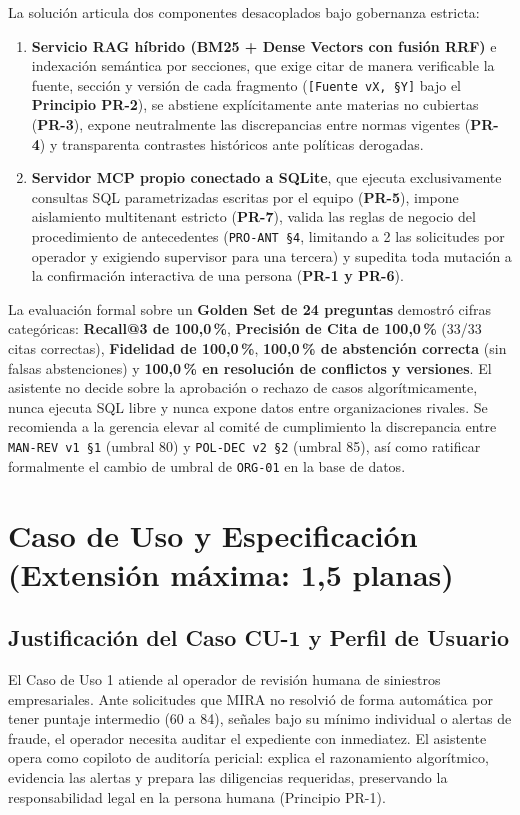 \documentclass[11pt,letterpaper]{article}
\begin{document}
La solución articula dos componentes desacoplados bajo gobernanza estricta:
\begin{enumerate}
    \item \textbf{Servicio RAG híbrido (BM25 + Dense Vectors con fusión RRF)} e indexación semántica por secciones, que exige citar de manera verificable la fuente, sección y versión de cada fragmento (\texttt{[Fuente vX, §Y]} bajo el \textbf{Principio PR-2}), se abstiene explícitamente ante materias no cubiertas (\textbf{PR-3}), expone neutralmente las discrepancias entre normas vigentes (\textbf{PR-4}) y transparenta contrastes históricos ante políticas derogadas.
    \item \textbf{Servidor MCP propio conectado a SQLite}, que ejecuta exclusivamente consultas SQL parametrizadas escritas por el equipo (\textbf{PR-5}), impone aislamiento multitenant estricto (\textbf{PR-7}), valida las reglas de negocio del procedimiento de antecedentes (\texttt{PRO-ANT §4}, limitando a 2 las solicitudes por operador y exigiendo supervisor para una tercera) y supedita toda mutación a la confirmación interactiva de una persona (\textbf{PR-1 y PR-6}).
\end{enumerate}

La evaluación formal sobre un \textbf{Golden Set de 24 preguntas} demostró cifras categóricas: \textbf{Recall@3 de 100,0\,\%}, \textbf{Precisión de Cita de 100,0\,\%} (33/33 citas correctas), \textbf{Fidelidad de 100,0\,\%}, \textbf{100,0\,\% de abstención correcta} (sin falsas abstenciones) y \textbf{100,0\,\% en resolución de conflictos y versiones}. El asistente no decide sobre la aprobación o rechazo de casos algorítmicamente, nunca ejecuta SQL libre y nunca expone datos entre organizaciones rivales. Se recomienda a la gerencia elevar al comité de cumplimiento la discrepancia entre \texttt{MAN-REV v1 §1} (umbral 80) y \texttt{POL-DEC v2 §2} (umbral 85), así como ratificar formalmente el cambio de umbral de \texttt{ORG-01} en la base de datos.

\newpage

\section{Caso de Uso y Especificación (Extensión máxima: 1,5 planas)}

\subsection{Justificación del Caso CU-1 y Perfil de Usuario}
El Caso de Uso 1 atiende al operador de revisión humana de siniestros empresariales. Ante solicitudes que MIRA no resolvió de forma automática por tener puntaje intermedio (60 a 84), señales bajo su mínimo individual o alertas de fraude, el operador necesita auditar el expediente con inmediatez. El asistente opera como copiloto de auditoría pericial: explica el razonamiento algorítmico, evidencia las alertas y prepara las diligencias requeridas, preservando la responsabilidad legal en la persona humana (Principio PR-1).
\end{document}
